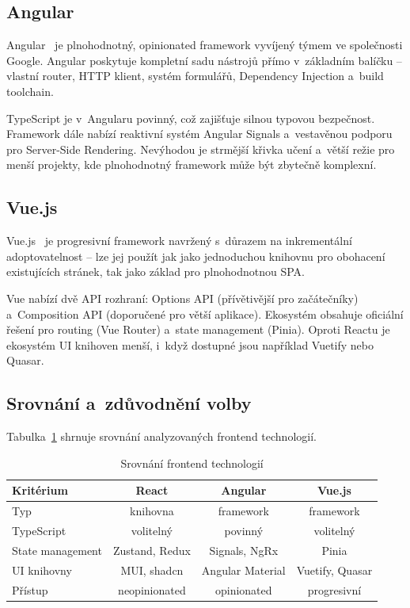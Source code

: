 \subsection{Angular}

Angular~\cite{angular} je plnohodnotný, opinionated framework vyvíjený týmem ve společnosti Google. Angular poskytuje kompletní sadu nástrojů přímo v~základním balíčku -- vlastní router, HTTP klient, systém formulářů, Dependency Injection a~build toolchain.

TypeScript je v~Angularu povinný, což zajišťuje silnou typovou bezpečnost. Framework dále nabízí reaktivní systém Angular Signals a~vestavěnou podporu pro Server-Side Rendering. Nevýhodou je strmější křivka učení a~větší režie pro menší projekty, kde plnohodnotný framework může být zbytečně komplexní.

\subsection{Vue.js}

Vue.js~\cite{vuejs} je progresivní framework navržený s~důrazem na inkrementální adoptovatelnost -- lze jej použít jak jako jednoduchou knihovnu pro obohacení existujících stránek, tak jako základ pro plnohodnotnou SPA.

Vue nabízí dvě API rozhraní: Options API (přívětivější pro začátečníky) a~Composition API (doporučené pro větší aplikace). Ekosystém obsahuje oficiální řešení pro routing (Vue Router) a~state management (Pinia). Oproti Reactu je ekosystém UI knihoven menší, i~když dostupné jsou například Vuetify nebo Quasar.

\subsection{Srovnání a~zdůvodnění volby}

Tabulka~\ref{tab:frontend-comparison} shrnuje srovnání analyzovaných frontend technologií.

\begin{table}[htbp]\centering\footnotesize
\caption{Srovnání frontend technologií}\label{tab:frontend-comparison}
\begin{tabular}{l|c|c|c}
	\textbf{Kritérium} & \textbf{React} & \textbf{Angular} & \textbf{Vue.js} \tabularnewline \hline
	Typ & knihovna & framework & framework \tabularnewline
	TypeScript & volitelný & povinný & volitelný \tabularnewline
	State management & Zustand, Redux & Signals, NgRx & Pinia \tabularnewline
	UI knihovny & MUI, shadcn & Angular Material & Vuetify, Quasar \tabularnewline
	Přístup & neopinionated & opinionated & progresivní \tabularnewline
\end{tabular}
\end{table}

